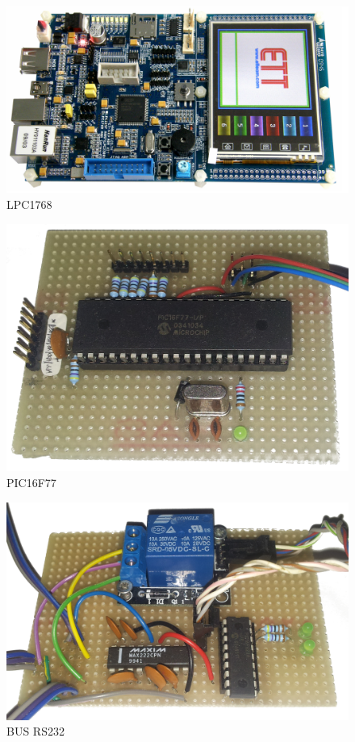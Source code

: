 \documentclass[a4paper,titlepage]{book}
\begin{document}
\begin{figure}[!h]
\centering
\includegraphics[scale=1]{lpc1768.png}
\caption{LPC1768}
\end{figure}


\begin{figure}[!h]
\centering
\includegraphics[scale=0.15]{pic16f77.png}
\caption{PIC16F77}
\end{figure}

\begin{figure}[!h]
\centering
\includegraphics[scale=0.12]{bus_foto.png}
\caption{BUS RS232}
\end{figure}
\end{document}
